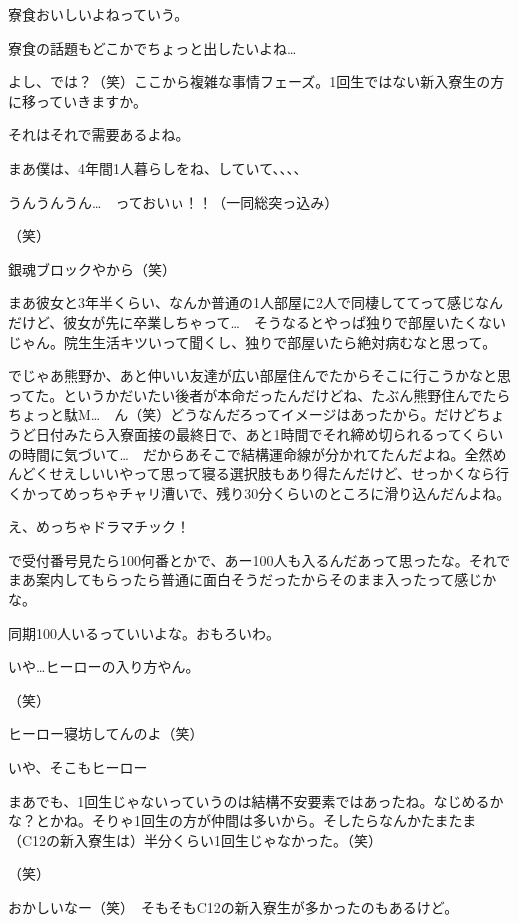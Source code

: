 \begin{multicols}{2}
  寮食おいしいよねっていう。

  寮食の話題もどこかでちょっと出したいよね…

  よし、では？（笑）ここから複雑な事情フェーズ。1回生ではない新入寮生の方に移っていきますか。

  それはそれで需要あるよね。

  まあ僕は、4年間1人暮らしをね、していて、、、、

  うんうんうん…　っておいぃ！！（一同総突っ込み）

  （笑）

  銀魂ブロックやから（笑）

  まあ彼女と3年半くらい、なんか普通の1人部屋に2人で同棲しててって感じなんだけど、彼女が先に卒業しちゃって…　そうなるとやっぱ独りで部屋いたくないじゃん。院生生活キツいって聞くし、独りで部屋いたら絶対病むなと思って。

  でじゃあ熊野か、あと仲いい友達が広い部屋住んでたからそこに行こうかなと思ってた。というかだいたい後者が本命だったんだけどね、たぶん熊野住んでたらちょっと駄M…　ん（笑）どうなんだろってイメージはあったから。だけどちょうど日付みたら入寮面接の最終日で、あと1時間でそれ締め切られるってくらいの時間に気づいて…　だからあそこで結構運命線が分かれてたんだよね。全然めんどくせえしいいやって思って寝る選択肢もあり得たんだけど、せっかくなら行くかってめっちゃチャリ漕いで、残り30分くらいのところに滑り込んだんよね。

  え、めっちゃドラマチック！

  で受付番号見たら100何番とかで、あー100人も入るんだあって思ったな。それでまあ案内してもらったら普通に面白そうだったからそのまま入ったって感じかな。

  同期100人いるっていいよな。おもろいわ。

  いや…ヒーローの入り方やん。

  （笑）

  ヒーロー寝坊してんのよ（笑）

  いや、そこもヒーロー

  まあでも、1回生じゃないっていうのは結構不安要素ではあったね。なじめるかな？とかね。そりゃ1回生の方が仲間は多いから。そしたらなんかたまたま（C12の新入寮生は）半分くらい1回生じゃなかった。（笑）

  （笑）

  おかしいなー（笑）　そもそもC12の新入寮生が多かったのもあるけど。


\end{multicols}
